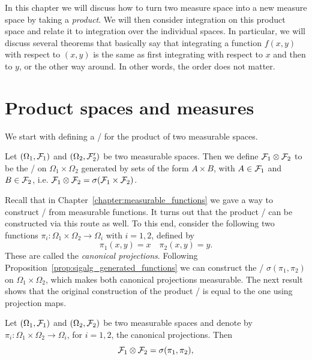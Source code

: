 
In this chapter we will discuss how to turn two measure space into a new measure space by taking a \emph{product}. We will then consider integration on this product space and relate it to integration over the individual spaces. In particular, we will discuss several theorems that basically say that integrating a function $f(x,y)$ with respect to $(x,y)$ is the same as first integrating with respect to $x$ and then to $y$, or the other way around. In other words, the order does not matter.

\section{Product spaces and measures}
\label{se:product-measures}

We start with defining a \sigalg/ for the product of two measurable spaces.

\begin{definition}\label{def:product_sigalg}
Let $(\Omega_1, \mathcal F_1)$ and $(\Omega_2, \mathcal F^\prime_2)$ be two measurable spaces. Then we define $\mathcal F_1 \otimes \mathcal F_2$ to be the \sigalg/ on $\Omega_1 \times \Omega_2$ generated by sets of the form $A \times B$, with $A \in \mathcal F_1$ and $B \in \mathcal F_2$, i.e. $\mathcal F_1 \otimes \mathcal F_2 = \sigma(\mathcal F_1 \times \mathcal F_2)$.
\end{definition}

Recall that in Chapter~\ref{chapter:measurable_functions} we gave a way to construct \sigalgs/ from measurable functions. It turns out that the product \sigalg/ can be constructed via this route as well. To this end, consider the following two functions $\pi_i : \Omega_1 \times \Omega_2 \to \Omega_i$ with $i = 1,2$, defined by 
\[
	\pi_1(x,y) = x \quad \pi_2(x,y) = y.
\]
These are called the \emph{canonical projections}. Following Proposition~\ref{prop:sigalg_generated_functions} we can construct the \sigalg/ $\sigma(\pi_1, \pi_2)$ on $\Omega_1 \times \Omega_2$, which makes both canonical projections measurable. The next result shows that the original construction of the product \sigalg/ is equal to the one using projection maps.

\begin{lemma}\label{lem:product_sigalg_equivalence}
Let $(\Omega_1, \mathcal F_1)$ and $(\Omega_2, \mathcal F_2)$ be two measurable spaces and denote by $\pi_i : \Omega_1 \times \Omega_2 \to \Omega_i$, for $i = 1,2$, the canonical projections. Then
\[
	\mathcal F_1 \otimes \mathcal F_2 = \sigma(\pi_1, \pi_2),
\]
\end{lemma}

